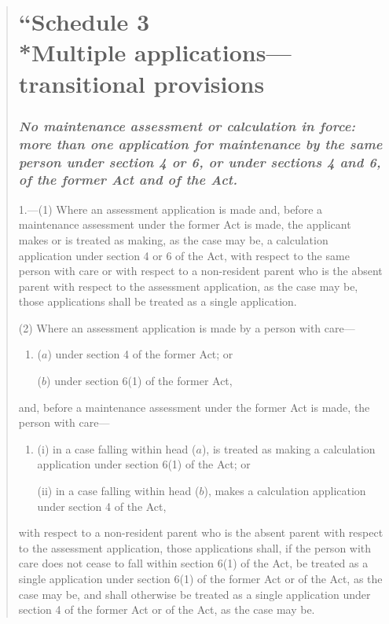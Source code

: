 \documentclass[12pt,a4paper]{article}
\begin{document}
\begin{quotation}
\part*{“Schedule 3\\*Multiple applications---transitional provisions}

\section*{\itshape No maintenance assessment or calculation in force: more than one application for maintenance by the same person under section 4 or 6, or under sections 4 and 6, of the former Act and of the Act.}

1.---(1)  Where an assessment application is made and, before a maintenance assessment under the former Act is made, the applicant makes or is treated as making, as the case may be, a calculation application under section 4 or 6 of the Act, with respect to the same person with care or with respect to a non-resident parent who is the absent parent with respect to the assessment application, as the case may be, those applications shall be treated as a single application.

(2) Where an assessment application is made by a person with care—
\begin{enumerate}\item[]
($a$) under section 4 of the former Act; or

($b$) under section 6(1) of the former Act,
\end{enumerate}
and, before a maintenance assessment under the former Act is made, the person with care—
\begin{enumerate}\item[]
(i) in a case falling within head ($a$), is treated as making a calculation application under section 6(1) of the Act; or

(ii) in a case falling within head ($b$), makes a calculation application under section 4 of the Act,
\end{enumerate}
with respect to a non-resident parent who is the absent parent with respect to the assessment application, those applications shall, if the person with care does not cease to fall within section 6(1) of the Act, be treated as a single application under section 6(1) of the former Act or of the Act, as the case may be, and shall otherwise be treated as a single application under section 4 of the former Act or of the Act, as the case may be.


\end{quotation}
\end{document}
